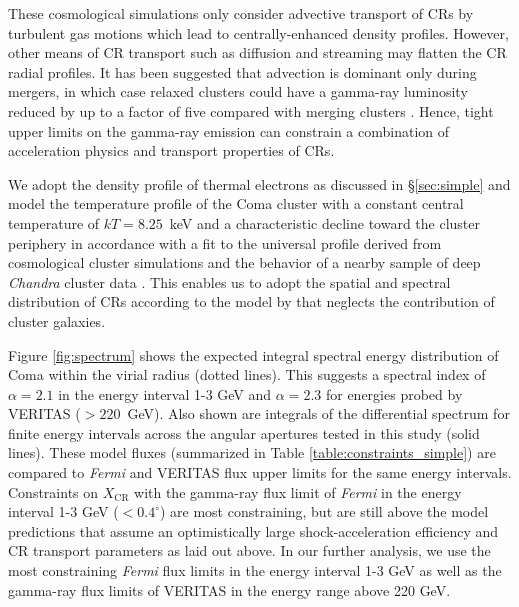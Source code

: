 \documentclass[12pt,manuscript]{aastex}
\def\Fermi{{\em Fermi}\xspace}
\newcommand{\CR}{\mathrm{CR}}
\begin{document}
These cosmological simulations only consider advective transport of CRs by turbulent gas motions
which lead to centrally-enhanced density profiles. However, other means of CR transport such as
diffusion and streaming may flatten the CR radial profiles. It has been suggested that advection is
dominant only during mergers, in which case relaxed clusters could have a gamma-ray luminosity 
reduced by up to a factor of five compared with merging clusters
\citep{article:EnsslinPfrommerMiniatiSubramanian:2011}. Hence, tight upper limits on the gamma-ray
emission can constrain a combination of acceleration physics and transport properties of CRs.

We adopt the density profile of thermal electrons as discussed in \S \ref{sec:simple} and model the
temperature profile
of the Coma cluster with a constant central temperature of $kT= 8.25$~keV and a characteristic
decline toward the cluster periphery in accordance with a fit to the universal profile derived from
cosmological cluster simulations \citep{article:PinzkePfrommer:2010, article:Pfrommer_etal:2007}
and the behavior of a nearby sample of deep {\em Chandra} cluster data
\citep{article:Vikhlinin_etal:2005}. This enables us to adopt the spatial and spectral distribution
of CRs according to the model by \citet{article:PinzkePfrommer:2010} that neglects the contribution
of cluster galaxies.

Figure \ref{fig:spectrum} shows the expected integral spectral energy distribution of Coma within
the virial radius (dotted lines). This suggests a spectral index of $\alpha=2.1$ in the energy
interval 1-3 GeV and $\alpha=2.3$ for energies probed by VERITAS ($>220$~GeV). Also
shown are integrals of the differential spectrum for finite energy intervals across the angular
apertures tested in this study (solid lines). These model fluxes (summarized in Table
\ref{table:constraints_simple}) are compared to \Fermi and VERITAS flux upper limits for the same
energy intervals. Constraints on $X_\CR$ with the gamma-ray flux limit of \Fermi in the energy
interval 1-3 GeV ($<0.4^\circ$) are most constraining, but are still above the model predictions
that assume an optimistically large shock-acceleration efficiency and CR transport parameters as
laid out above. In our further analysis, we use the most constraining \Fermi flux limits in the
energy interval 1-3 GeV as well as the gamma-ray flux limits of VERITAS in the energy range above
220 GeV.
\end{document}
